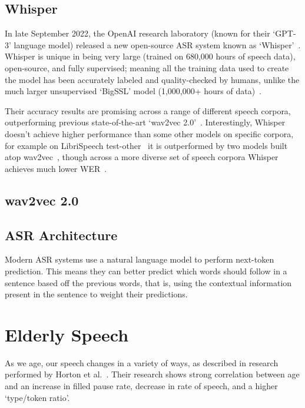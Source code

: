 \subsection{Whisper}\label{subsec:whisper}

In late September 2022, the OpenAI research laboratory (known for their `GPT-3' language model)
released a new open-source ASR system known as `Whisper'~\cite{whisper}.
Whisper is unique in being very large (trained on 680,000 hours of speech data), open-source, and
fully supervised;
meaning all the training data used to create the model has been accurately labeled and
quality-checked by humans, unlike the much larger unsupervised `BigSSL' model (1,000,000+ hours
of data)~\cite{bigssl}.

Their accuracy results are promising across a range of different speech corpora, outperforming
previous state-of-the-art `wav2vec 2.0'~\cite{wav2vec}.
Interestingly, Whisper doesn't achieve higher performance than some other models on specific
corpora, for example on LibriSpeech test-other~\cite{librispeech} it is outperformed by
two models built atop wav2vec~\cite{zhang2020,chung2021}, though across a more diverse set
of speech corpora Whisper achieves much lower WER~\cite{whisper}.

\subsection{wav2vec 2.0}\label{subsec:wav2vec}

\subsection{ASR Architecture}\label{subsec:asr-architecture}

Modern ASR systems use a natural language model to perform next-token prediction.
This means they can better predict which words should follow in a sentence based off the previous
words, that is, using the contextual information present in the sentence to weight their
predictions.

\section{Elderly Speech}\label{sec:elderly-speech}

As we age, our speech changes in a variety of ways, as described in research
performed by Horton et al.~\cite{Horton2010}.
Their research shows strong correlation between age and an increase in filled pause rate,
decrease in rate of speech, and a higher `type/token ratio'.


